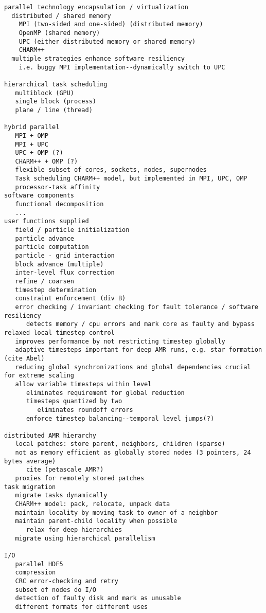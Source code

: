 \documentclass[14pt]{article}
\begin{document}
\begin{verbatim}
parallel technology encapsulation / virtualization
  distributed / shared memory
    MPI (two-sided and one-sided) (distributed memory)
    OpenMP (shared memory) 
    UPC (either distributed memory or shared memory)
    CHARM++
  multiple strategies enhance software resiliency
    i.e. buggy MPI implementation--dynamically switch to UPC

hierarchical task scheduling
   multiblock (GPU)
   single block (process)
   plane / line (thread)

hybrid parallel
   MPI + OMP
   MPI + UPC
   UPC + OMP (?)
   CHARM++ + OMP (?)
   flexible subset of cores, sockets, nodes, supernodes
   Task scheduling CHARM++ model, but implemented in MPI, UPC, OMP
   processor-task affinity
software components
   functional decomposition
   ...
user functions supplied
   field / particle initialization
   particle advance
   particle computation
   particle - grid interaction
   block advance (multiple)
   inter-level flux correction
   refine / coarsen
   timestep determination
   constraint enforcement (div B)
   error checking / invariant checking for fault tolerance / software resiliency
      detects memory / cpu errors and mark core as faulty and bypass
relaxed local timestep control
   improves performance by not restricting timestep globally
   adaptive timesteps important for deep AMR runs, e.g. star formation (cite Abel)
   reducing global synchronizations and global dependencies crucial for extreme scaling
   allow variable timesteps within level
      eliminates requirement for global reduction
      timesteps quantized by two
         eliminates roundoff errors
      enforce timestep balancing--temporal level jumps(?)

distributed AMR hierarchy
   local patches: store parent, neighbors, children (sparse)
   not as memory efficient as globally stored nodes (3 pointers, 24 bytes average)
      cite (petascale AMR?)
   proxies for remotely stored patches
task migration
   migrate tasks dynamically
   CHARM++ model: pack, relocate, unpack data
   maintain locality by moving task to owner of a neighbor
   maintain parent-child locality when possible
      relax for deep hierarchies
   migrate using hierarchical parallelism

I/O
   parallel HDF5
   compression
   CRC error-checking and retry
   subset of nodes do I/O
   detection of faulty disk and mark as unusable
   different formats for different uses


\end{verbatim}
\end{document}

